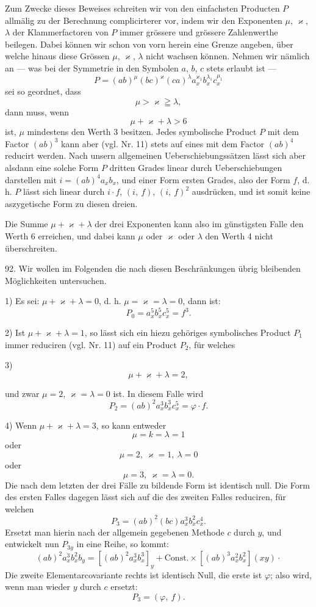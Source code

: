 \documentclass[11pt]{article}
\providecommand{\weberpage}[1]{}
\begin{document}
Zum Zwecke dieses Beweises schreiten wir von den einfachsten Producten $P$ allmälig zu der Berechnung complicirterer vor, indem wir den Exponenten $\mu$, $\varkappa$, $\lambda$ der Klammerfactoren von $P$ immer grössere und grössere Zahlenwerthe beilegen. Dabei können wir schon von vorn herein eine Grenze angeben, über welche hinaus diese Grössen $\mu$, $\varkappa$, $\lambda$ nicht wachsen können. Nehmen wir nämlich an --- was bei der Symmetrie in den Symbolen $a$, $b$, $c$ stets erlaubt ist ---
\[
P = (ab)^\mu (bc)^\varkappa (ca)^\lambda a_x^{\varkappa_1} b_x^{\lambda_1} c_x^{\mu_1}
\]
sei so geordnet, dass
\[
\mu > \varkappa \geqq \lambda,
\]
dann muss, wenn
\[
\mu + \varkappa + \lambda > 6
\]
ist, $\mu$ mindestens den Werth 3 besitzen. Jedes symbolische Product $P$ mit dem Factor $(ab)^3$ kann aber (vgl. Nr. 11) stets auf eines mit dem Factor $(ab)^4$ reducirt werden. Nach unsern allgemeinen Ueberschiebungssätzen lässt sich aber alsdann eine solche Form $P$ dritten Grades linear durch Ueberschiebungen darstellen mit $i = (ab)^4 a_x b_x$, und einer Form ersten Grades, also der Form $f$, d. h. $P$ lässt sich linear durch $i\cdot f$, $(i,\ f)$, $(i,\ f)^2$ ausdrücken, und ist somit keine aszygetische Form zu diesen dreien.

Die Summe $\mu + \varkappa + \lambda$ der drei Exponenten kann also im günstigsten Falle den Werth 6 erreichen, und dabei kann $\mu$ oder $\varkappa$ oder $\lambda$ den Werth 4 nicht überschreiten.

92. Wir wollen im Folgenden die nach diesen Beschränkungen übrig bleibenden Möglichkeiten untersuchen.

1) Es sei: $\mu + \varkappa + \lambda = 0$, d. h. $\mu = \varkappa = \lambda = 0$, dann ist:
\[
P_0 = a_x^5 b_x^5 c_x^5 = f^3.
\]

2) Ist $\mu + \varkappa + \lambda = 1$, so lässt sich ein hiezu gehöriges symbolisches Product $P_1$ immer reduciren (vgl. Nr. 11) auf ein Product $P_2$, für welches

3)
\[
\mu + \varkappa + \lambda = 2,
\]


\weberpage{95}
und zwar $\mu = 2$, $\varkappa = \lambda = 0$ ist. In diesem Falle wird
\[
P_2 = (ab)^2 a_x^3 b_x^3 c_x^5 = \varphi \cdot f.
\]

4) Wenn $\mu + \varkappa + \lambda = 3$, so kann entweder
\[
\mu = k = \lambda = 1 %
\]
oder
\[
\mu = 2,\ \varkappa = 1,\ \lambda = 0
\]
oder
\[
\mu = 3,\ \varkappa = \lambda = 0.
\]
Die nach dem letzten der drei Fälle zu bildende Form ist identisch null. Die Form des ersten Falles dagegen lässt sich auf die des zweiten Falles reduciren, für welchen
\[
P_3 = (ab)^2 (bc) a_x^3 b_x^2 c_x^4.
\]
Ersetzt man hierin nach der allgemein gegebenen Methode $c$ durch $y$, und entwickelt nun $P_{3y}$ in eine Reihe, so kommt:
\[
(ab)^2 a_x^3 b_x^2 b_y = [(ab)^2 a_x^3 b_x^3]_y + \text{Const.} \times [(ab)^3 a_x^2 b_x^2] (xy) \cdot
\]
Die zweite Elementarcovariante rechts ist identisch Null, die erste ist $\varphi$; also wird, wenn man wieder $y$ durch $c$ ersetzt:
\[
P_3 = (\varphi,\ f).
\]
\end{document}
